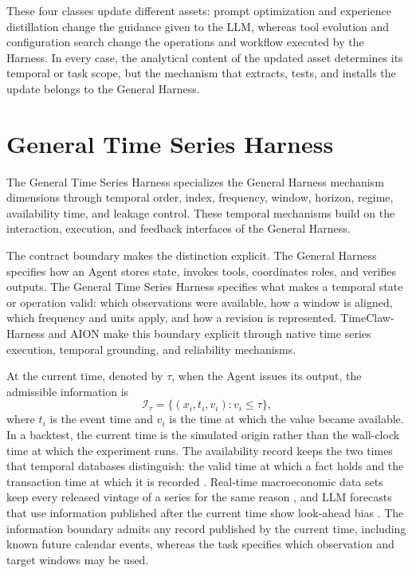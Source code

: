 \documentclass[preprints,article,submit,moreauthors]{Definitions/mdpi}
\begin{document}
These four classes update different assets: prompt optimization and experience distillation change the guidance given to the LLM, whereas tool evolution and configuration search change the operations and workflow executed by the Harness. In every case, the analytical content of the updated asset determines its temporal or task scope, but the mechanism that extracts, tests, and installs the update belongs to the General Harness.

\section{General Time Series Harness}
\label{sec:general-ts-harness}

The General Time Series Harness specializes the General Harness mechanism dimensions through temporal order, index, frequency, window, horizon, regime, availability time, and leakage control. These temporal mechanisms build on the interaction, execution, and feedback interfaces of the General Harness.

The contract boundary makes the distinction explicit. The General Harness specifies how an Agent stores state, invokes tools, coordinates roles, and verifies outputs. The General Time Series Harness specifies what makes a temporal state or operation valid: which observations were available, how a window is aligned, which frequency and units apply, and how a revision is represented. TimeClaw-Harness \citep{timeclaw2026harness} and AION \citep{aion2026} make this boundary explicit through native time series execution, temporal grounding, and reliability mechanisms.

At the current time, denoted by $\tau$, when the Agent issues its output, the admissible information is
\begin{equation}
  \mathcal{I}_{\tau} = \{(x_i,t_i,v_i): v_i \leq \tau\},
  \label{eq:temporal-availability}
\end{equation}
where $t_i$ is the event time and $v_i$ is the time at which the value became available. In a backtest, the current time is the simulated origin rather than the wall-clock time at which the experiment runs. The availability record keeps the two times that temporal databases distinguish: the valid time at which a fact holds and the transaction time at which it is recorded \citep{snodgrass1985taxonomy,jensen1999temporal}. Real-time macroeconomic data sets keep every released vintage of a series for the same reason \citep{croushore2001realtime}, and LLM forecasts that use information published after the current time show look-ahead bias \citep{glasserman2023lookahead,gao2025lookahead}. The information boundary admits any record published by the current time, including known future calendar events, whereas the task specifies which observation and target windows may be used.
\end{document}
